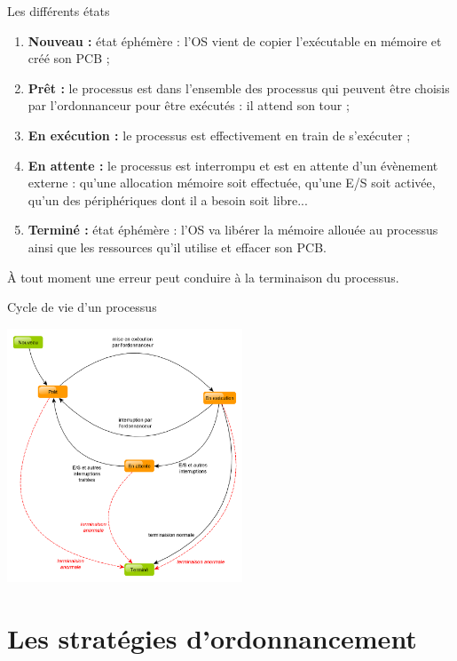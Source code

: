\documentclass[10pt]{nsibeamer}
\begin{document}
\begin{frame}{Les différents états}\pause
\begin{enumerate}[--]
	\item \textbf{Nouveau : } état éphémère : l'OS vient de copier l'exécutable en mémoire et créé son PCB ;\pause 
    \item \textbf{Prêt : } le processus est dans l'ensemble des processus qui peuvent être choisis par l'ordonnanceur pour être exécutés : il attend son tour ;\pause
    \item \textbf{En exécution :} le processus est effectivement en train de s'exécuter ;\pause
    \item \textbf{En attente :} le processus est interrompu et est en attente d'un évènement externe : qu'une allocation mémoire soit effectuée, qu'une E/S soit activée, qu'un des périphériques dont il a besoin soit libre...\pause
    \item \textbf{Terminé :} état éphémère : l'OS va libérer la mémoire allouée au processus ainsi que les ressources qu'il utilise et effacer son PCB.\pause
\end{enumerate}
À tout moment une erreur peut conduire à la terminaison du processus.
\end{frame}

\begin{frame}{Cycle de vie d'un processus}
\begin{center}
\includegraphics[width=7cm]{img/cycle_proc}
\end{center}
\end{frame}

\section{Les stratégies d'ordonnancement}
\end{document}
